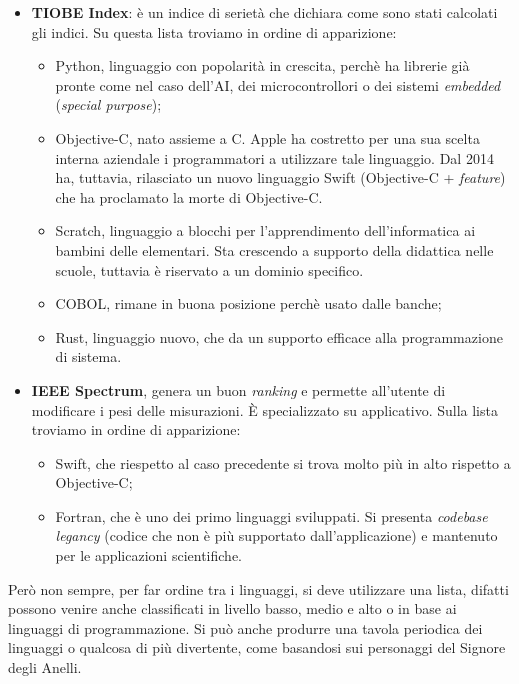 \documentclass[10pt,a4paper]{book}
\begin{document}
\begin{itemize}
\item \textbf{TIOBE Index}: \`e un indice di seriet\`a che dichiara come sono stati calcolati gli indici. Su questa lista troviamo in ordine di apparizione:
\begin{itemize}
\item Python, linguaggio con popolarit\`a in crescita, perch\`e ha librerie gi\`a pronte come nel caso dell'AI, dei microcontrollori o dei sistemi \textit{embedded} (\textit{special purpose});
\item Objective-C, nato assieme a C. Apple ha costretto per una sua scelta interna aziendale i programmatori a utilizzare tale linguaggio. Dal 2014 ha, tuttavia, rilasciato un nuovo linguaggio Swift (Objective-C + \textit{feature}) che ha proclamato la morte di Objective-C.
\item Scratch, linguaggio a blocchi per l'apprendimento dell'informatica ai bambini delle elementari. Sta crescendo a supporto della didattica nelle scuole, tuttavia  \`e riservato a un dominio specifico.
\item COBOL, rimane in buona posizione perch\`e usato dalle banche;
\item Rust, linguaggio nuovo, che da un supporto efficace alla programmazione di sistema.
\end{itemize}
\item \textbf{IEEE Spectrum}, genera un buon \textit{ranking} e permette all'utente di modificare i pesi delle misurazioni. \`E specializzato su applicativo. Sulla lista troviamo in ordine di apparizione:
\begin{itemize}
\item Swift, che riespetto al caso precedente si trova molto pi\`u in alto rispetto a Objective-C;
\item Fortran, che \`e uno dei primo linguaggi sviluppati. Si presenta \textit{codebase legancy} (codice che non \`e pi\`u supportato dall'applicazione) e mantenuto per le applicazioni scientifiche.
\end{itemize}
\end{itemize}
\noindent
Per\`o non sempre, per far ordine tra i linguaggi, si deve utilizzare una lista, difatti possono venire anche classificati in livello basso, medio e alto o in base ai linguaggi di programmazione. Si pu\`o anche produrre una tavola periodica dei linguaggi o  qualcosa di pi\`u divertente, come basandosi sui personaggi del Signore degli Anelli.\\\\
\end{document}
